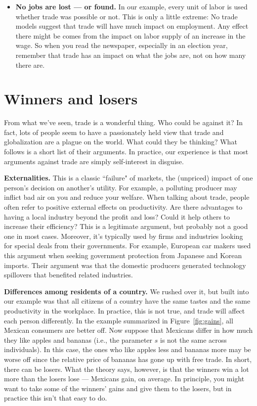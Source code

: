 \begin{itemize}
\item \textbf{No jobs are lost --- or found.}
In our example, every unit of labor is used whether trade was possible or not.
This is only a little extreme:  No trade models suggest that trade will have much
impact on employment.  Any effect there might be comes from the
impact on labor supply of an increase in the wage.
So when you read the newspaper, especially in an election year,
remember that trade has an impact on what the jobs are, not on how
many there are.
\end{itemize}

\section{Winners and losers}

From what we've seen, trade is a wonderful thing.  Who could
be against it?  In fact, lots of people seem to have a
passionately held view that trade and globalization are a
plague on the world.  What could they be thinking? What follows is
a short list of their arguments.
In practice, our experience is that most arguments against trade
are simply self-interest in disguise.


\textbf{Externalities.}  This is a classic ``failure" of markets,
the (unpriced) impact of one person's decision on another's
utility. For example, a polluting producer may inflict bad air on
you and reduce your welfare. When talking about trade, people
often refer to positive external effects on productivity.  Are
there advantages to having a local industry beyond the profit and
loss? Could it help others to increase their efficiency? This is a
legitimate argument, but probably not a good one in most cases.
Moreover, it's typically used by firms and industries looking for
special deals from their governments. For example,
European car makers used this argument when seeking government protection from
Japanese and Korean imports. Their argument was that the domestic
producers generated technology spillovers that benefited
related industries.

\textbf{Differences among residents of a country.} We rushed over
it, but built into our example was that all citizens of a
country have the same tastes and the same productivity in the
workplace. In practice, this is not true, and trade will affect
each person differently. In the example summarized in
Figure~\ref{fig:gains}, all Mexican consumers are better off. Now
suppose that Mexicans differ in how much they like apples and bananas
(i.e., the parameter $s$ is not the same across
individuals). In this case, the ones who like apples less and
bananas more may be worse off since the relative price of bananas
has gone up with free trade. In short, there can be losers. What
the theory says, however, is that the winners win a lot more than
the losers lose --- Mexicans gain, on average.
In principle, you might want to take some of the winners' gains and give them to the
losers, but in practice this isn't that easy to do.

